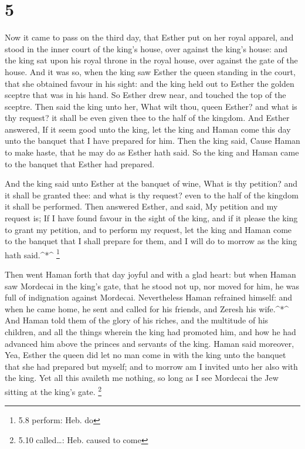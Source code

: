 \hypertarget{section-4}{%
\section{5}\label{section-4}}

 Now it came to pass on the third day, that Esther put on
her royal apparel, and stood in the inner court of the king's house,
over against the king's house: and the king sat upon his royal throne in
the royal house, over against the gate of the house.  And it
was so, when the king saw Esther the queen standing in the court, that
she obtained favour in his sight: and the king held out to Esther the
golden sceptre that was in his hand. So Esther drew near, and touched
the top of the sceptre.  Then said the king unto her, What
wilt thou, queen Esther? and what is thy request? it shall be even given
thee to the half of the kingdom.  And Esther answered, If it
seem good unto the king, let the king and Haman come this day unto the
banquet that I have prepared for him.  Then the king said,
Cause Haman to make haste, that he may do as Esther hath said. So the
king and Haman came to the banquet that Esther had prepared.

 And the king said unto Esther at the banquet of wine, What
is thy petition? and it shall be granted thee: and what is thy request?
even to the half of the kingdom it shall be performed.  Then
answered Esther, and said, My petition and my request is; 
If I have found favour in the sight of the king, and if it please the
king to grant my petition, and to perform my request, let the king and
Haman come to the banquet that I shall prepare for them, and I will do
to morrow as the king hath said.\^{}*\^{} \footnote{5.8 perform: Heb. do}

 Then went Haman forth that day joyful and with a glad
heart: but when Haman saw Mordecai in the king's gate, that he stood not
up, nor moved for him, he was full of indignation against Mordecai.
 Nevertheless Haman refrained himself: and when he came
home, he sent and called for his friends, and Zeresh his wife.\^{}*\^{}
 And Haman told them of the glory of his riches, and the
multitude of his children, and all the things wherein the king had
promoted him, and how he had advanced him above the princes and servants
of the king.  Haman said moreover, Yea, Esther the queen
did let no man come in with the king unto the banquet that she had
prepared but myself; and to morrow am I invited unto her also with the
king.  Yet all this availeth me nothing, so long as I see
Mordecai the Jew sitting at the king's gate. \footnote{5.10
  called\ldots: Heb. caused to come}

